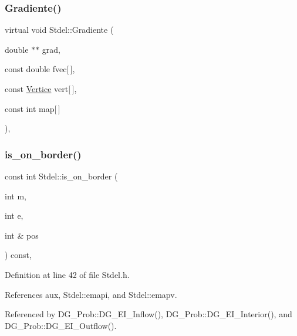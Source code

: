 \subsubsection{\texorpdfstring{Gradiente()}{Gradiente()}\hspace{0.1cm}{\footnotesize\ttfamily [6/6]}}
{\footnotesize\ttfamily virtual void Stdel\+::\+Gradiente (\begin{DoxyParamCaption}\item[{double $\ast$$\ast$}]{grad,  }\item[{const double}]{fvec\mbox{[}$\,$\mbox{]},  }\item[{const \hyperlink{structVertice}{Vertice}}]{vert\mbox{[}$\,$\mbox{]},  }\item[{const int}]{map\mbox{[}$\,$\mbox{]} }\end{DoxyParamCaption})\hspace{0.3cm}{\ttfamily [pure virtual]}, {\ttfamily [inherited]}}

\mbox{\label{classStdel_abb022f0ad81707e11e3a3091d2d87c46}} 
\subsubsection{\texorpdfstring{is\+\_\+on\+\_\+border()}{is\_on\_border()}}
{\footnotesize\ttfamily const int Stdel\+::is\+\_\+on\+\_\+border (\begin{DoxyParamCaption}\item[{int}]{m,  }\item[{int}]{e,  }\item[{int \&}]{pos }\end{DoxyParamCaption}) const\hspace{0.3cm}{\ttfamily [inline]}, {\ttfamily [inherited]}}



Definition at line 42 of file Stdel.\+h.



References aux, Stdel\+::emapi, and Stdel\+::emapv.



Referenced by D\+G\+\_\+\+Prob\+::\+D\+G\+\_\+\+E\+I\+\_\+\+Inflow(), D\+G\+\_\+\+Prob\+::\+D\+G\+\_\+\+E\+I\+\_\+\+Interior(), and D\+G\+\_\+\+Prob\+::\+D\+G\+\_\+\+E\+I\+\_\+\+Outflow().

